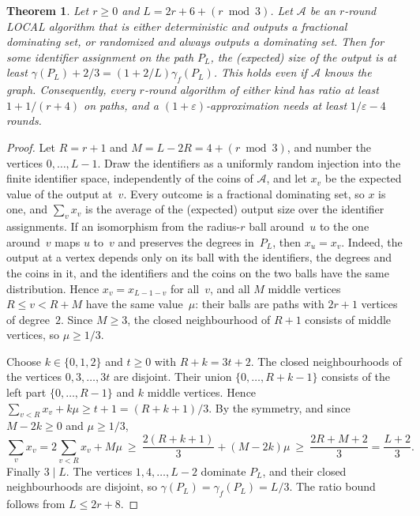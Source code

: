 \documentclass[11pt]{article}
\newtheorem{theorem}{Theorem}
\theoremstyle{remark}
\begin{document}
\begin{theorem}\label{thm:lower}
Let $r\ge0$ and $L=2r+6+(r\bmod 3)$. Let $\mathcal A$ be an $r$-round LOCAL algorithm that is
either deterministic and outputs a fractional dominating set, or randomized and always outputs a
dominating set. Then for some identifier assignment on the path $P_L$, the (expected) size of the
output is at least $\gamma(P_L)+2/3=(1+2/L)\gamma_f(P_L)$. This holds even if $\mathcal A$ knows the
graph. Consequently, every $r$-round algorithm of either kind has ratio at least $1+1/(r+4)$ on paths,
and a $(1+\varepsilon)$-approximation needs at least $1/\varepsilon-4$ rounds.
\end{theorem}
\begin{proof}
Let $R=r+1$ and $M=L-2R=4+(r\bmod3)$, and number the vertices $0,\dots,L-1$. Draw the identifiers
as a uniformly random injection into the finite identifier space, independently of the coins of
$\mathcal A$, and let $x_v$ be the expected value of the output at~$v$. Every outcome is a
fractional dominating set, so $x$ is one, and $\sum_vx_v$ is the average of the (expected) output
size over the identifier assignments. If an isomorphism from the radius-$r$ ball around~$u$ to the one around~$v$
maps $u$ to~$v$ and preserves the degrees in~$P_L$, then $x_u=x_v$. Indeed, the output at a vertex
depends only on its ball with the identifiers, the degrees and the coins in it, and the identifiers
and the coins on the two balls have the same distribution. Hence
$x_v=x_{L-1-v}$ for all~$v$, and all $M$ middle vertices $R\le v<R+M$ have the same value~$\mu$:
their balls are paths with $2r+1$ vertices of degree~$2$. Since $M\ge3$, the closed neighbourhood
of $R+1$ consists of middle vertices, so $\mu\ge1/3$.

Choose $k\in\{0,1,2\}$ and $t\ge0$ with $R+k=3t+2$. The closed neighbourhoods of the vertices
$0,3,\dots,3t$ are disjoint. Their union $\{0,\dots,R+k-1\}$ consists of the left part
$\{0,\dots,R-1\}$ and $k$ middle vertices. Hence $\sum_{v<R}x_v+k\mu\ge t+1=(R+k+1)/3$.
By the symmetry, and since $M-2k\ge0$ and $\mu\ge1/3$,
\[
  \sum_vx_v=2\sum_{v<R}x_v+M\mu\ \ge\ \frac{2(R+k+1)}{3}+(M-2k)\mu\ \ge\ \frac{2R+M+2}{3}=\frac{L+2}{3}.
\]
Finally $3\mid L$. The vertices $1,4,\dots,L-2$ dominate $P_L$, and their closed neighbourhoods are
disjoint, so $\gamma(P_L)=\gamma_f(P_L)=L/3$. The ratio bound follows from $L\le2r+8$.
\end{proof}
\end{document}
